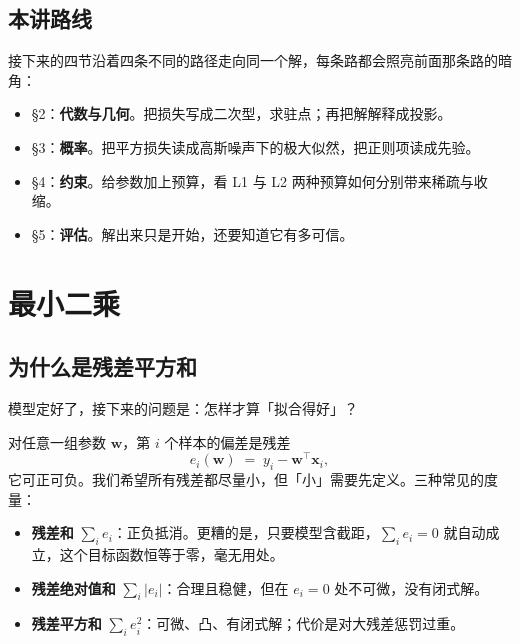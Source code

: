 \documentclass[11pt,a4paper,fontset=windows,zihao=-4]{ctexart}
\newcommand{\bw}{\mathbf{w}}
\newcommand{\bx}{\mathbf{x}}
\newcommand{\tp}{^{\top}}
\newcommand{\abs}[1]{\lvert #1\rvert}
\begin{document}
\subsection{本讲路线}

接下来的四节沿着四条不同的路径走向同一个解，每条路都会照亮前面那条路的暗角：

\begin{itemize}
  \item \S2：\textbf{代数与几何}。把损失写成二次型，求驻点；再把解解释成投影。
  \item \S3：\textbf{概率}。把平方损失读成高斯噪声下的极大似然，把正则项读成先验。
  \item \S4：\textbf{约束}。给参数加上预算，看 L1 与 L2 两种预算如何分别带来稀疏与收缩。
  \item \S5：\textbf{评估}。解出来只是开始，还要知道它有多可信。
\end{itemize}


\section{最小二乘}

\subsection{为什么是残差平方和}

模型定好了，接下来的问题是：怎样才算「拟合得好」？

对任意一组参数 $\bw$，第 $i$ 个样本的偏差是残差
\begin{equation}
  e_i(\bw) \;=\; y_i-\bw\tp\bx_i ,
\end{equation}
它可正可负。我们希望所有残差都尽量小，但「小」需要先定义。三种常见的度量：

\begin{itemize}
  \item \textbf{残差和} $\sum_i e_i$：正负抵消。更糟的是，只要模型含截距，$\sum_i e_i=0$ 就自动成立，这个目标函数恒等于零，毫无用处。
  \item \textbf{残差绝对值和} $\sum_i\abs{e_i}$：合理且稳健，但在 $e_i=0$ 处不可微，没有闭式解。
  \item \textbf{残差平方和} $\sum_i e_i^2$：可微、凸、有闭式解；代价是对大残差惩罚过重。
\end{itemize}
\end{document}
